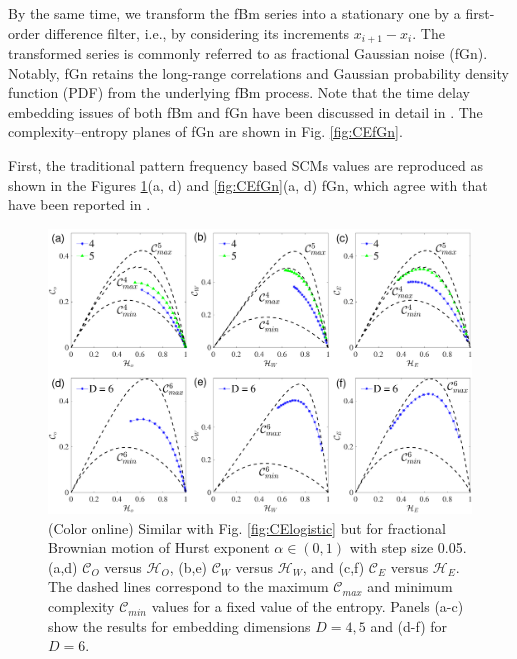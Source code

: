 \documentclass[12pt,aip,cha,reprint,nofootinbib]{revtex4-1}
\begin{document}
By the same time, we transform the fBm series into a stationary one by a first-order difference filter, i.e., by considering its increments $x_{i+1}- x_i$. The transformed series is commonly referred to as fractional Gaussian noise (fGn). Notably, fGn retains the long-range correlations and Gaussian probability density function (PDF) from the underlying
fBm process. Note that the time delay embedding issues of both fBm and fGn have been discussed in detail in \cite{Zou2015}. The complexity--entropy planes of fGn are shown in Fig. \ref{fig:CEfGn}. 

First, the traditional pattern frequency based SCMs values are reproduced as shown in the Figures \ref{fig:CEfBm}(a, d) and \ref{fig:CEfGn}(a, d) fGn, which agree with that have been reported in \cite{RossoPRE2007,rossoPRL2007}. 

\begin{figure}
	\centering 
	\includegraphics[width=2\columnwidth]{CompEntropy_fBm.pdf}
\caption{\small{(Color online) Similar with Fig. \ref{fig:CElogistic} but for fractional Brownian motion of Hurst exponent $\alpha \in (0, 1)$ with step size 0.05. (a,d) $\mathcal{C}_O$ versus $\mathcal{H}_O$, (b,e) $\mathcal{C}_{W}$ versus $\mathcal{H}_{W}$, and (c,f) $\mathcal{C}_{E}$ versus $\mathcal{H}_{E}$. The dashed lines correspond to the maximum $\mathcal{C}_{max}$ and minimum complexity $\mathcal{C}_{min}$ values for a fixed value of the entropy. Panels (a-c) show the results for embedding dimensions $D = 4,5$ and (d-f) for $D = 6$. }  \label{fig:CEfBm}}
\end{figure}
\end{document}
